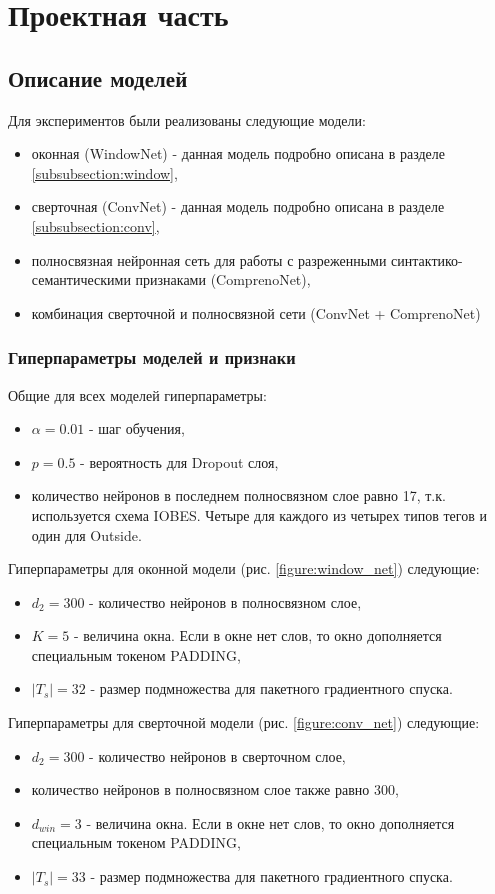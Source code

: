 \chapter{Проектная часть}

\section{Описание моделей}

Для экспериментов были реализованы следующие модели:
\begin{itemize}
\item оконная (WindowNet) - данная модель подробно описана в разделе \ref{subsubsection:window},
\item сверточная (ConvNet) - данная модель подробно описана в разделе \ref{subsubsection:conv},
\item полносвязная нейронная сеть для работы с разреженными синтактико-семантическими признаками (ComprenoNet),
\item комбинация сверточной и полносвязной сети (ConvNet + ComprenoNet)
\end{itemize}

\subsection{Гиперпараметры моделей и признаки}

Общие для всех моделей гиперпараметры:
\begin{itemize}
\item $\alpha=0.01$ - шаг обучения,
\item $p=0.5$ - вероятность для Dropout слоя,
\item количество нейронов в последнем полносвязном слое равно 17,
т.к. используется схема IOBES. Четыре для каждого из четырех типов тегов и один для Outside.
\end{itemize}

Гиперпараметры для оконной модели (рис. \ref{figure:window_net}) следующие:
\begin{itemize}
\item $d_2 = 300$ - количество нейронов в полносвязном слое,
\item $K=5$ - величина окна. Если в окне нет слов, то окно дополняется специальным токеном PADDING,
\item $|T_s|=32$ - размер подмножества для пакетного градиентного спуска.
\end{itemize}

Гиперпараметры для сверточной модели (рис. \ref{figure:conv_net}) следующие:
\begin{itemize}
\item $d_2 = 300$ - количество нейронов в сверточном слое,
\item количество нейронов в полносвязном слое также равно 300,
\item $d_{win} = 3$ - величина окна. Если в окне нет слов, то окно дополняется специальным токеном PADDING,
\item $|T_s|=33$ - размер подмножества для пакетного градиентного спуска.
\end{itemize}

